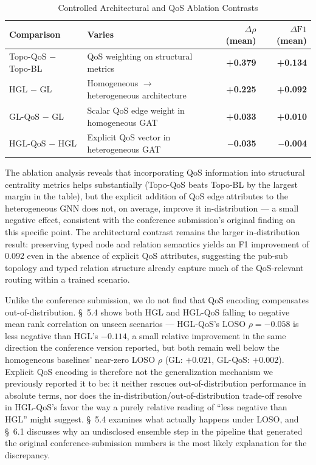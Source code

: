 \documentclass[review]{elsarticle}
\begin{document}
\begin{table}[htbp]
\centering
\caption{Controlled Architectural and QoS Ablation Contrasts}
\label{tab:ablation}
\begin{tabular}{@{}llrr@{}}
\toprule
Comparison & Varies & $\Delta\rho$ (mean) & $\Delta\text{F1}$ (mean) \\
\midrule
Topo-QoS $-$ Topo-BL & QoS weighting on structural metrics & \textbf{+0.379} & \textbf{+0.134} \\
HGL $-$ GL & Homogeneous $\to$ heterogeneous architecture & \textbf{+0.225} & \textbf{+0.092} \\
GL-QoS $-$ GL & Scalar QoS edge weight in homogeneous GAT & \textbf{+0.033} & \textbf{+0.010} \\
HGL-QoS $-$ HGL & Explicit QoS vector in heterogeneous GAT & \textbf{$-$0.035} & \textbf{$-$0.004} \\
\bottomrule
\end{tabular}
\end{table}

The ablation analysis reveals that incorporating QoS information into structural centrality metrics
helps substantially (Topo-QoS beats Topo-BL by the largest margin in the table), but the explicit
addition of QoS edge attributes to the heterogeneous GNN does not, on average, improve it
in-distribution --- a small negative effect, consistent with the conference submission's original
finding on this specific point. The architectural contrast remains the larger in-distribution
result: preserving typed node and relation semantics yields an F1 improvement of 0.092 even in the
absence of explicit QoS attributes, suggesting the pub-sub topology and typed relation structure
already capture much of the QoS-relevant routing within a trained scenario.

Unlike the conference submission, we do not find that QoS encoding compensates
out-of-distribution. \S~5.4 shows both HGL and HGL-QoS falling to negative mean rank correlation on
unseen scenarios --- HGL-QoS's LOSO $\rho=-0.058$ is less negative than HGL's $-0.114$, a small
relative improvement in the same direction the conference version reported, but both remain well
below the homogeneous baselines' near-zero LOSO $\rho$ (GL: $+0.021$, GL-QoS: $+0.002$). Explicit
QoS encoding is therefore not the generalization mechanism we previously reported it to be: it
neither rescues out-of-distribution performance in absolute terms, nor does the
in-distribution/out-of-distribution trade-off resolve in HGL-QoS's favor the way a purely relative
reading of ``less negative than HGL'' might suggest. \S~5.4 examines what actually happens under
LOSO, and \S~6.1 discusses why an undisclosed ensemble step in the pipeline that generated the
original conference-submission numbers is the most likely explanation for the discrepancy.
\end{document}

